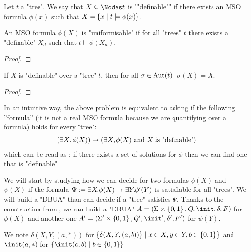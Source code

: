 \documentclass[twoside]{article}
\begin{document}
\begin{definition}\label{def:definable}
	Let $t$ a "tree". We say that $X \subseteq \Nodes t$ is ""definable"" if there exists an MSO formula $\phi(x)$ such that $ X = \left\{x \mid t \models \phi(x)\right\}$.
\end{definition}

\begin{lemma}
	An MSO formula $\phi(X)$ is "uniformisable" if for all "trees" $t$ there exists a "definable" $X_d$ such that $t \models \phi(X_d)$.
\end{lemma}

\begin{proof}
	\todo{~}
\end{proof}

\begin{lemma}\label{lem:def-aut}
	If $X$ is "definable" over a "tree" $t$, then for all $\sigma \in \text{Aut}(t)$, $\sigma(X) = X$.
\end{lemma}

\begin{proof}
	\todo{~}

\end{proof}

In an intuitive way, the above problem is equivalent to asking if the following ''formula'' (it is not a real MSO formula
because we are quantifying over a formula) holds for every "tree":
\[ (\exists X.\, \phi(X)) \rightarrow (\exists X, \phi(X) \text{ and $X$ is "definable"})\]
which can be read as : if there exists a set of solutions for $\phi$ then we can find one that is "definable".

We will start by studying how we can decide for two formulas $\phi(X)$ and $\psi(X)$ if the formula $\Psi := \exists X. \phi (X) \rightarrow \exists Y. \phi' (Y)$
is satisfiable for all "trees". We will build a "DBUA" than can decide if a "tree" satisfies $\Psi$.
Thanks to the construction from , we can build a "DBUA" $A = (\Sigma \times \set{0,1}, Q, \init, \delta, F)$ for $\phi(X)$
and another one $A' = (\Sigma' \times \set{0,1}, Q', \init', \delta', F')$ for $\psi(Y)$.


\begin{notation}
	We note $\delta(X,Y, (a, *))$ for $\{ \delta(X,Y,(a,b)) \}  \mid  x \in X, y \in Y, b \in \left\{0,1\right\}\}$ and
	$\init(a,*)$ for $\setdef{\init(a,b)} {b \in \set{0,1}}$
\end{notation}
\end{document}
